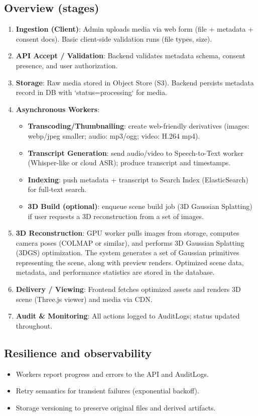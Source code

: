 \subsection{Overview (stages)}
\begin{enumerate}
  \item \textbf{Ingestion (Client)}: Admin uploads media via web form (file + metadata + consent docs). Basic client-side validation runs (file types, size).
  \item \textbf{API Accept / Validation}: Backend validates metadata schema, consent presence, and user authorization.
  \item \textbf{Storage}: Raw media stored in Object Store (S3). Backend persists metadata record in DB with `status=processing` for media.
  \item \textbf{Asynchronous Workers}:
    \begin{itemize}
      \item \textbf{Transcoding/Thumbnailing}: create web-friendly derivatives (images: webp/jpeg smaller; audio: mp3/ogg; video: H.264 mp4).
      \item \textbf{Transcript Generation}: send audio/video to Speech-to-Text worker (Whisper-like or cloud ASR); produce transcript and timestamps.
      \item \textbf{Indexing}: push metadata + transcript to Search Index (ElasticSearch) for full-text search.
      \item \textbf{3D Build (optional)}: enqueue scene build job (3D Gaussian Splatting) if user requests a 3D reconstruction from a set of images.    \end{itemize}
\item \textbf{3D Reconstruction}: GPU worker pulls images from storage, computes camera poses (COLMAP or similar), and performs 3D Gaussian Splatting (3DGS) optimization. The system generates a set of Gaussian primitives representing the scene, along with preview renders. Optimized scene data, metadata, and performance statistics are stored in the database.
\item \textbf{Delivery / Viewing}: Frontend fetches optimized assets and renders 3D scene (Three.js viewer) and media via CDN.
  \item \textbf{Audit \& Monitoring}: All actions logged to AuditLogs; status updated throughout.
\end{enumerate}

\subsection{Resilience and observability}
\begin{itemize}
  \item Workers report progress and errors to the API and AuditLogs.
  \item Retry semantics for transient failures (exponential backoff).
  \item Storage versioning to preserve original files and derived artifacts.
\end{itemize}


